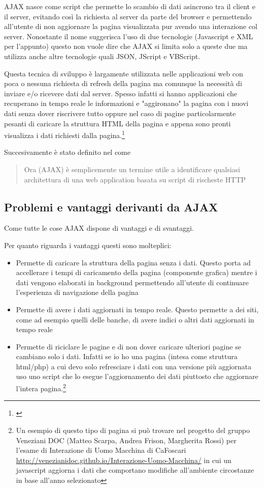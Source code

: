 \documentclass[a4paper,14pt]{article}
\begin{document}
AJAX nasce come script che permette lo scambio di dati asincrono tra il client e il server, evitando così la richiesta al server da parte del browser e permettendo all'utente di non aggiornare la pagina visualizzata pur avendo una interazione col server. Nonostante il nome suggerisca l'uso di due tecnologie (Javascript e XML per l'appunto) questo non vuole dire che AJAX si limita solo a queste due ma utilizza anche altre tecnologie quali JSON, JScript e VBScript.

Questa tecnica di sviluppo è largamente utilizzata nelle applicazioni web con poca o nessuna richiesta di refresh della pagina ma comunque la necessità di inviare e/o ricevere dati dal server. Spesso infatti si hanno applicazioni che recuperano in tempo reale le informazioni e "aggironano" la pagina con i nuovi dati senza dover riscrivere tutto oppure nel caso di pagine particolarmente pesanti di caricare la struttura HTML della pagina e appena sono pronti visualizza i dati richiesti dalla pagina.\footnote{\cites{flanaganjavascript} }

Succesivamente è stato definito nel \textcites[pag~491]{flanaganjavascript} come 
\begin{quotation}
Ora (AJAX) è semplicemente un termine utile a identificare qualsiasi architettura di una web application basata su script di rischeste HTTP
\end{quotation}

\subsection{Problemi e vantaggi derivanti da AJAX}
Come tutte le cose AJAX dispone di vantaggi e di svantaggi.

Per quanto riguarda i vantaggi questi sono molteplici:
\begin{itemize}
\item Permette di caricare la struttura della pagina senza i dati. Questo porta ad accellerare i tempi di caricamento della pagina (componente grafica) mentre i dati vengono elaborati in background permettendo all'utente di continuare l'esperienza di navigazione della pagina
\item Permette di avere i dati aggiornati in tempo reale. Questo permette a dei siti, come ad esempio quelli delle banche, di avere indici o altri dati aggiornati in tempo reale
\item Permette di riciclare le pagine e di non dover caricare ulteriori pagine se cambiano solo i dati. Infatti se io ho una pagina (intesa come struttura html/php) a cui devo solo refresciare i dati con una versione più aggiornata uso uno script che lo esegue l'aggiornamento dei dati piuttosto che aggiornare l'intera pagina.\footnote{Un esempio di questo tipo di pagina si può trovare nel progetto del gruppo Veneziani DOC (Matteo Scarpa, Andrea Frison, Margherita Rossi) per l'esame di Interazione di Uomo Macchina di CaFoscari \url{http://venezianidoc.github.io/Interazione-Uomo-Macchina/} in cui un javascript aggiorna i dati che comportano modifiche all'ambiente circostanze in base all'anno selezionato}
\end{itemize}
\end{document}
